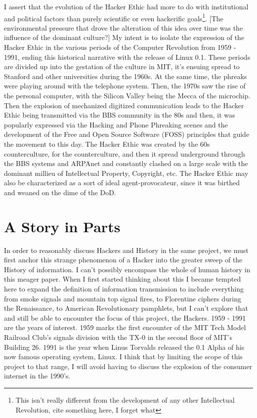 \documentclass[11pt]{article}
\begin{document}
I assert that the evolution of the Hacker Ethic had more to do with institutional and political factors than purely scientific or even hackerific goals\footnote{This isn't really different from the development of any other Intellectual Revolution, cite something here, I forget what}. [The environmental pressure that drove the alteration of this idea over time was the influence of the dominant culture?] My intent is to isolate the expression of the Hacker Ethic in the various periods of the Computer Revolution from 1959 - 1991, ending this historical narrative with the release of Linux 0.1. These periods are divided up into the gestation of the culture in MIT, it’s ensuing spread to Stanford and other universities during the 1960s. At the same time, the phreaks were playing around with the telephone system. Then, the 1970s saw the rise of the personal computer, with the Silicon Valley being the Mecca of the microchip. Then the explosion of mechanized digitized communication leads to the Hacker Ethic being transmitted via the BBS community in the 80s and then, it was popularly expressed via the Hacking and Phone Phreaking scenes and the development of the Free and Open Source Software (FOSS) principles that guide the movement to this day. The Hacker Ethic was created by the 60s counterculture, for the counterculture, and then it spread underground through the BBS systems and ARPAnet and constantly clashed on a large scale with the dominant millieu of Intellectual Property, Copyright, etc. The Hacker Ethic may also be characterized as a sort of ideal agent-provocateur, since it was birthed and weaned on the dime of the DoD.

\section{A Story in Parts}

In order to reasonably discuss Hackers and History in the same project, we must first anchor this strange phenomenon of a Hacker into the greater sweep of the History of information. I can't possibly encompass the whole of human history in this meager paper. When I first started thinking about this I became tempted here to expand the definition of information transmission to include everything from smoke signals and mountain top signal fires, to Florentine ciphers during the Renaissance, to American Revolutionary pamphlets, but I can't explore that and still be able to encounter the focus of this project, the Hackers. 1959 - 1991 are the years of interest. 1959 marks the first encounter of the MIT Tech Model Railroad Club's signals division with the TX-0 in the second floor of MIT's Building 26. 1991 is the year when Linus Torvalds released the 0.1 Alpha of his now famous operating system, Linux. I think that by limiting the scope of this project to that range, I will avoid having to discuss the explosion of the consumer internet in the 1990's.
\end{document}
